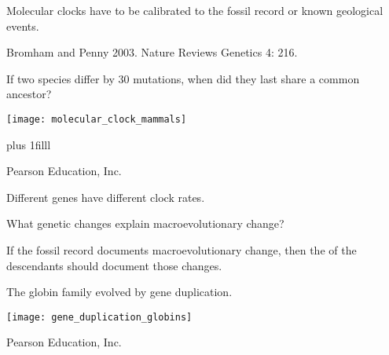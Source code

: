 \documentclass[t]{beamer}
\begin{document}
%
{
\begin{frame}[b]{Molecular clocks have to be calibrated to the fossil record or known geological events.}

\hfill \tiny Bromham and Penny 2003. Nature Reviews Genetics 4: 216.
\end{frame}
}
%
\begin{frame}[t]{If two species differ by 30 mutations, when did they last share a common ancestor?}

	\texttt{[image: molecular\_clock\_mammals]}
	

	\vskip0pt plus 1filll
	
	\hfill \tiny \textcopyright Pearson Education, Inc.
\end{frame}
%
{
\begin{frame}[b]{Different genes have different clock rates.}

\end{frame}
}
%
\begin{frame}{What genetic changes explain macroevolutionary change?}

	\hangpara If the fossil record documents macroevolutionary change, 
	then the  of the descendants should document those changes.
	 
\end{frame}
%
{
\begin{frame}[b]
\end{frame}
}
%
\begin{frame}{The globin family evolved by gene duplication.}

	\centering\texttt{[image: gene\_duplication\_globins]}
	 
	 \vfilll
	 
	 \hfill \tiny \textcopyright Pearson Education, Inc.
\end{frame}
%

\end{document}
